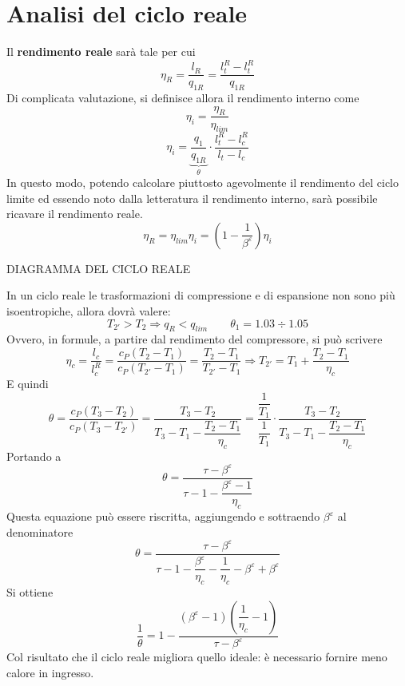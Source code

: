 \section{Analisi del ciclo reale}
\begin{adjustwidth}{2in}{}
	Il \textbf{rendimento reale} sarà tale per cui 
	\[\eta_R = \dfrac{l_R}{q_{1R}} = \dfrac{l_t^R - l_t^R}{q_{1R}}\]
	Di complicata valutazione, si definisce allora il rendimento interno come 
	\[\eta_i = \dfrac{\eta_R}{\eta_{lim}}\]
	\begin{equation}\label{eq:2.2}
		\boxed{\eta_i = \underbrace{\dfrac{q_1}{q_{1R}}}_{\theta}\cdot\dfrac{l_t^R - l_c^R}{l_t - l_c}}
	\end{equation}
	In questo modo, potendo calcolare piuttosto agevolmente il rendimento del ciclo limite ed essendo noto dalla letteratura il rendimento interno, sarà possibile ricavare il rendimento reale. 
	\[\eta_R = \eta_{lim}\eta_i = \left(1-\dfrac{1}{\beta^\varepsilon}\right)\eta_i\]	
	
	DIAGRAMMA DEL CICLO REALE 
	
	In un ciclo reale le trasformazioni di compressione e di espansione non sono più isoentropiche, allora dovrà valere: 
	\[T_{2'}>T_2 \Rightarrow q_R<q_{lim} \qquad \theta_1 = 1.03\div1.05\]
	Ovvero, in formule, a partire dal rendimento del compressore, si può scrivere 
	\[\eta_c = \dfrac{l_c}{l_c^R} = \dfrac{c_P(T_2-T_1)}{c_P(T_{2'}-T_1)} = \dfrac{T_2-T_1}{T_{2'}-T_1} \Rightarrow T_{2'} = T_1 + \dfrac{T_2-T_1}{\eta_c}\]
	E quindi
	\[\theta = \dfrac{c_P(T_3-T_2)}{c_P(T_3-T_{2'})} = \dfrac{T_3-T_2}{T_3 - T_1 - \dfrac{T_2-T_1}{\eta_c}} = \dfrac{\dfrac{1}{T_1}}{\dfrac{1}{T_1}}\cdot\dfrac{T_3-T_2}{T_3 - T_1 - \dfrac{T_2-T_1}{\eta_c}}\]
	Portando a 
	\[\theta = \dfrac{\tau-\beta^\varepsilon}{\tau - 1 - \dfrac{\beta^\varepsilon-1}{\eta_c}}\]
	Questa equazione può essere riscritta, aggiungendo e sottraendo $\beta^\varepsilon$ al denominatore
	\[\theta = \dfrac{\tau-\beta^\varepsilon}{\tau - 1 - \dfrac{\beta^\varepsilon}{\eta_c}- \dfrac{1}{\eta_c}- \beta^\varepsilon + \beta^\varepsilon} \]
	Si ottiene 
	\[\dfrac{1}{\theta} = 1- \dfrac{(\beta^\varepsilon -1)\left(\dfrac{1}{\eta_c}-1\right)}{\tau - \beta^\varepsilon}\]
	Col risultato che il ciclo reale migliora quello ideale: è necessario fornire meno calore in ingresso. \newline 
	

\end{adjustwidth}
